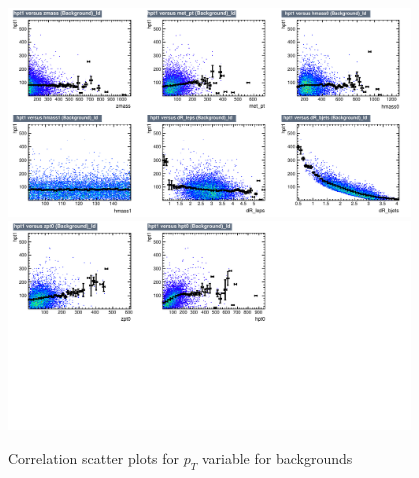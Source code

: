\begin{figure}[!htb]%
\centering
\includegraphics[width=0.95\textwidth]{figures/CRTT/dataset/plots/correlationscatter_hpt1__Id_c3.pdf}
\includegraphics[width=0.95\textwidth]{figures/CRTT/dataset/plots/correlationscatter_hpt1__Id_c4.pdf}
\caption{ Correlation scatter plots for \HBB $p_{T}$ variable for backgrounds}%
\label{fig:correlations_CRTT_hpt1_BG}                                                       
\end{figure}



